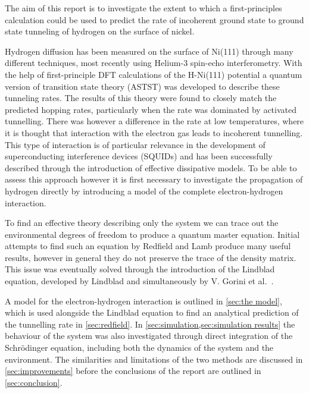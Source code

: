 
The aim of this report is to
investigate the extent to which
a first-principles calculation
could be used to predict the rate of
incoherent ground state to
ground state tunneling of hydrogen
on the surface of nickel.

Hydrogen diffusion has been measured
on the surface of Ni(111) %
through many different
techniques\cite{LIN199141, Ni_Diffusion_Experement},
most recently
using Helium-3 spin-echo
interferometry\cite{Helium_spin_echo}.
With the help of first-principle DFT calculations of
the H-Ni(111) potential a %
quantum version of transition state theory (ASTST)
was developed to describe these tunneling rates\cite{Jianding-Zhu}.
The results of this theory
were found to closely
match the predicted
hopping rates, particularly
when the rate was dominated
by activated tunnelling\cite{Jianding-Zhu}.
There was however a difference
in the rate at low temperatures,
where it is thought that interaction with the
electron gas leads to incoherent tunnelling.
This type of interaction
is of particular relevance in
the development of superconducting interference devices
(SQUIDs)\cite{QubitIncoherentSaito2004}
and has been successfully described
through the introduction
of effective dissipative models\cite{CALDEIRA1983374}.
To be able to assess this approach
however it is first necessary to
investigate the propagation of hydrogen directly
by introducing a model of the
complete electron-hydrogen
interaction.

To find an effective
theory describing only the system
we can trace out the
environmental degrees of
freedom to produce a quantum master
equation. Initial
attempts to find such an
equation by Redfield\cite{REDFIELD19651}
and Lamb\cite{PhysRev.134.A1429} produce
many useful results, however in
general they do not preserve the
trace of the density matrix\cite{Chru_ci_ski_2017}. This
issue was eventually solved through
the introduction of the
Lindblad equation, developed
by Lindblad\cite{Lindblad1976}
and simultaneously
by V. Gorini et al.~\cite{doi:10.1063/1.522979}.



A model for the electron-hydrogen
interaction is outlined in
\cref{sec:the model},
which is used
alongside the
Lindblad equation
to find an analytical prediction
of the tunnelling rate
in \cref{sec:redfield}.
In
\cref{sec:simulation,sec:simulation results}
the behaviour of the
system was also
investigated
through direct integration
of the
Schrödinger equation,
including both the dynamics
of the system and the environment.
The similarities and
limitations of the two
methods are discussed
in \cref{sec:improvements}
before the conclusions of
the report are
outlined in \cref{sec:conclusion}.




